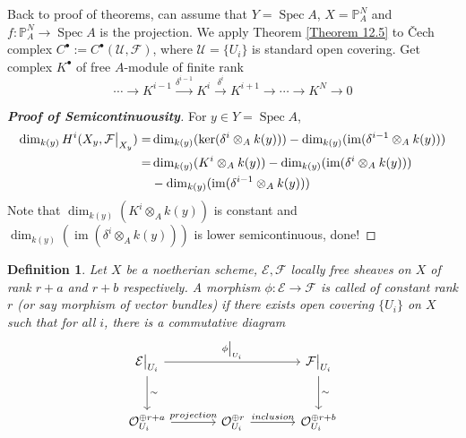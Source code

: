 \documentclass{ctexart}
\newtheorem{definition}{Definition}[section]
\newcommand{\im}{\operatorname{im}}
\newcommand{\spec}{\operatorname{Spec}}
\begin{document}
Back to proof of theorems, can assume that $Y = \spec A$, $X = \mathbb{P}_{A}^{N}$ and $f: \mathbb{P}_{A}^{N} \longrightarrow \spec A$ is the projection.
We apply Theorem \ref{Theorem 12.5} to Čech complex $C^{\bullet} := C^{\bullet}(\mathcal{U}, \mathcal{F})$, where $\mathcal{U} = \{U_{i}\}$ is standard open covering.
Get complex $K^{\bullet}$ of free $A$-module of finite rank
\begin{equation*}
    \cdots \longrightarrow K^{i - 1} \overset{\delta^{i - 1}}{\longrightarrow} K^{i} \overset{\delta^{i}}{\longrightarrow} K^{i + 1} \longrightarrow \cdots \longrightarrow K^{N} \longrightarrow 0
\end{equation*}
\begin{proof}[\textbf{\emph{Proof of Semicontinuousity}}]
    For $y\in Y = \spec A$, 
    \begin{equation*}
        \begin{split}
            \dim_{k(y)}H^{i}(X_{y}, \mathcal{F}\big{|}_{X_{y}}) = & \dim_{k(y)}(\ker(\delta^{i} \otimes_{A} k(y))) - \dim_{k(y)}(\im(\delta^{i - 1} \otimes_{A} k(y))) \\
            = & \dim_{k(y)}(K^{i} \otimes_{A} k(y)) - \dim_{k(y)}(\im(\delta^{i} \otimes_{A} k(y))) \\
            & - \dim_{k(y)}(\im(\delta^{i - 1} \otimes_{A} k(y)))
        \end{split}
    \end{equation*}
    Note that $\dim_{k(y)}(K^{i} \otimes_{A} k(y))$ is constant and $\dim_{k(y)}(\im(\delta^{i} \otimes_{A} k(y)))$ is lower semicontinuous, done!
\end{proof}
\begin{definition}
    Let $X$ be a noetherian scheme, $\mathcal{E}, \mathcal{F}$ locally free sheaves on $X$ of rank $r + a$ and $r + b$ respectively.
    A morphism $\phi: \mathcal{E} \longrightarrow \mathcal{F}$ is called of constant rank $r$ (or say morphism of vector bundles) if there exists open covering $\{U_{i}\}$ on $X$ such that for all $i$, there is a commutative diagram
    \begin{equation*}
        \begin{tikzcd}[sep = large]
            \mathcal{E}\big{|}_{U_{i}} \arrow[rr, "\phi\big{|}_{U_{i}}"] \arrow[d, "\sim"] &&
            \mathcal{F}\big{|}_{U_{i}} \arrow[d, "\sim"] \\
            \mathcal{O}_{U_{i}}^{\oplus r + a} \arrow[r, "projection"] &
            \mathcal{O}_{U_{i}}^{\oplus r} \arrow[r, "inclusion"] &
            \mathcal{O}_{U_{i}}^{\oplus r + b}
        \end{tikzcd}
    \end{equation*}
\end{definition}
\end{document}
